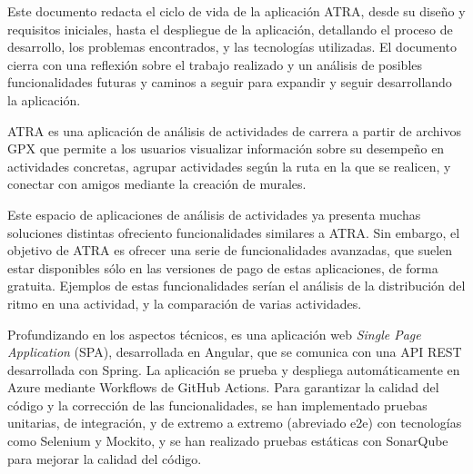 Este documento redacta el ciclo de vida de la aplicación ATRA, desde su diseño y requisitos iniciales, hasta el despliegue de la aplicación, detallando el proceso de desarrollo, los problemas encontrados, y las tecnologías utilizadas. El documento cierra con una reflexión sobre el trabajo realizado y un análisis de posibles funcionalidades futuras y caminos a seguir para expandir y seguir desarrollando la aplicación. 

ATRA es una aplicación de análisis de actividades de carrera a partir de archivos GPX que permite a los usuarios visualizar información sobre su desempeño en actividades concretas, agrupar actividades según la ruta en la que se realicen, y conectar con amigos mediante la creación de murales. 

Este espacio de aplicaciones de análisis de actividades ya presenta muchas soluciones distintas ofreciento funcionalidades similares a ATRA. Sin embargo, el objetivo de ATRA es ofrecer una serie de funcionalidades avanzadas, que suelen estar disponibles sólo en las versiones de pago de estas aplicaciones, de forma gratuita. Ejemplos de estas funcionalidades serían el análisis de la distribución del ritmo en una actividad, y la comparación de varias actividades.

Profundizando en los aspectos técnicos, es una aplicación web \textit{Single Page Application} (SPA), desarrollada en Angular, que se comunica con una API REST desarrollada con Spring. La aplicación se prueba y despliega automáticamente en Azure mediante Workflows de GitHub Actions. Para garantizar la calidad del código y la corrección de las funcionalidades, se han implementado pruebas unitarias, de integración, y de extremo a extremo (abreviado e2e) con tecnologías como Selenium y Mockito, y se han realizado pruebas estáticas con SonarQube para mejorar la calidad del código.



